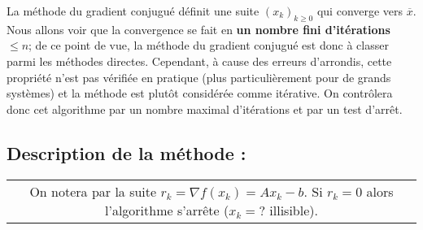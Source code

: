 \documentclass[a4paper,11pt]{article}
\theoremstyle{plain} %
\begin{document}
La méthode du gradient conjugué définit une suite $(x_k)_{k\geq 0}$ qui
converge vers $\overline{x}$. Nous allons voir que la convergence se fait
en \textbf{un nombre fini d'itérations $\leq n$};  de ce point de vue,
la méthode du gradient conjugué est donc à classer parmi les méthodes
directes. Cependant, à cause des erreurs d'arrondis, cette propriété
n'est pas vérifiée en pratique (plus particulièrement pour de grands
systèmes) et la méthode est plutôt considérée comme itérative. On
contrôlera donc cet algorithme par un nombre maximal d'itérations et
par un test d'arrêt.

\subsection{Description de la méthode :}

\noindent
\begin{tabular}{||c}
    \begin{minipage}[c]{15cm}
        On notera par la suite $r_k = \nabla f(x_k) = A x_k - b$. Si
        $r_k = 0$ alors l'algorithme s'arrête ($x_k = ?$ illisible).
    \end{minipage}
\end{tabular}
\end{document}
